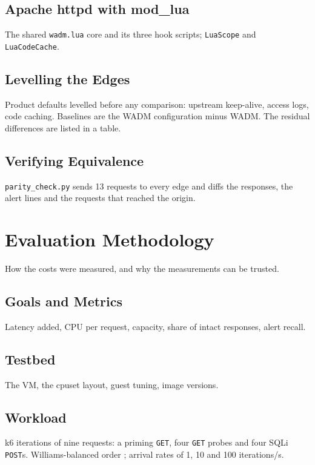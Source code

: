 \documentclass{rptuma}
\begin{document}
\section{Apache httpd with mod\_lua}
The shared \texttt{wadm.lua} core and its three hook scripts; \texttt{LuaScope} and
\texttt{LuaCodeCache}.

\section{Levelling the Edges}
\label{sec:A.level}
Product defaults levelled before any comparison: upstream keep-alive, access logs, code caching.
Baselines are the WADM configuration minus WADM. The residual differences are listed in a table.

\section{Verifying Equivalence}
\texttt{parity\_check.py} sends 13 requests to every edge and diffs the responses, the alert lines
and the requests that reached the origin.

\chapter{Evaluation Methodology}
How the costs were measured, and why the measurements can be trusted.

\section{Goals and Metrics}
Latency added, CPU per request, capacity, share of intact responses, alert recall.

\section{Testbed}
The VM, the cpuset layout, guest tuning, image versions.

\section{Workload}
k6 iterations of nine requests: a priming \texttt{GET}, four \texttt{GET} probes and four SQLi
\texttt{POST}s. Williams-balanced order \cite{williams1949designs}; arrival rates of 1, 10 and 100
iterations/s.
\end{document}
